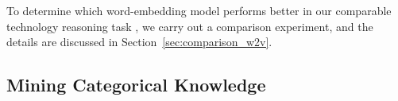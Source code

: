 To determine which word-embedding model performs better in our comparable technology reasoning task , we carry out a comparison experiment, and the details are discussed in Section~\ref{sec:comparison_w2v}.



\subsection{Mining Categorical Knowledge}

\label{sec:categoryKG}

